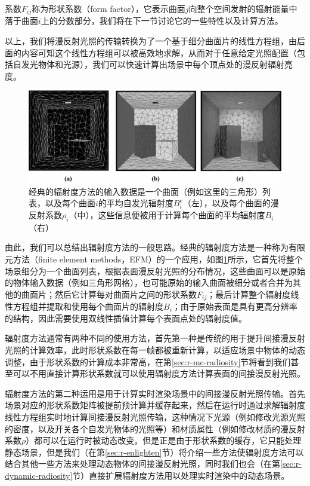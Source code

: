 \noindent 系数$F_{ij}$称为形状系数（form factor），它表示曲面$j$向整个空间发射的辐射能量中落于曲面$i$上的分数部分，我们将在下一节讨论它的一些特性以及计算方法。

以上，我们将漫反射光照的传输转换为了一个基于细分曲面片的线性方程组，由后面的内容可知这个线性方程组可以被高效地求解，从而对于任意给定光照配置（包括自发光物体和光源），我们可以快速计算出场景中每个顶点处的漫反射辐射亮度。

\begin{figure}
	\includegraphics[width=1.\textwidth]{graphics/gi/path-19}
	\caption{经典的辐射度方法的输入数据是一个曲面（例如这里的三角形）列表，以及每个曲面$i$的平均自发光辐射度$B_{i}^{e}$（左），以及每个曲面的漫反射系数$\rho_i$（中），这些信息便被用于计算每个曲面的平均辐射度$B_i$（右）}
	\label{f:r-radiosity-system-of-equations}
\end{figure}

由此，我们可以总结出辐射度方法的一般思路。经典的辐射度方法是一种称为有限元方法（finite element methods，EFM）的一个应用，如图\ref{f:r-radiosity-system-of-equations}所示，它首先将整个场景细分为一个曲面列表，根据表面漫反射光照的分布情况，这些曲面可以是原始的物体输入数据（例如三角形网格），也可能原始的输入曲面被细分或者合并为其他的曲面片；然后它计算每对曲面片之间的形状系数$F_{ij}$；最后计算整个辐射度线性方程组并提取和使用每个曲面片的辐射度$B_i$；由于原始表面是具有更高分辨率的结构，因此需要使用双线性插值计算每个表面点处的辐射度值。

辐射度方法通常有两种不同的使用方法，首先第一种是传统的用于提升间接漫反射光照的计算效率，此时形状系数在每一帧都被重新计算，以适应场景中物体的动态调整，由于形状系数的计算成本非常高，在第\ref{sec:r-mc-radiosity}节将看到我们甚至可以不用直接计算形状系数就可以使用辐射度方法计算表面的间接漫反射光照。

辐射度方法的第二种运用是用于计算实时渲染场景中的间接漫反射光照传输。首先场景对应的形状系数矩阵被提前预计算并缓存起来，然后在运行时通过求解辐射度线性方程组实时地计算间接漫反射光照传输，这种情况下光源（例如修改光源光照的密度，以及开关各个自发光物体的光照等）和材质属性（例如修改材质的漫反射系数$\rho$）都可以在运行时被动态改变。但是正是由于形状系数的缓存，它只能处理静态场景，但是我们（在第\ref{sec:r-enlighten}节）将介绍一些方法使辐射度方法可以结合其他一些方法来处理动态物体的间接漫反射光照，同时我们也会（在第\ref{sec:r-dynamic-radiosity}节）直接扩展辐射度方法用以处理实时渲染中的动态场景。

